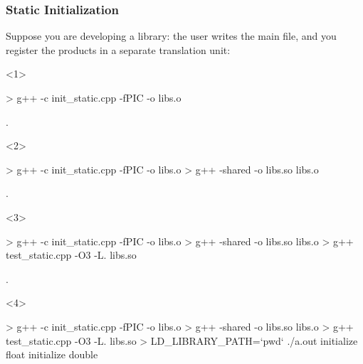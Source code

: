 \documentclass[aspectratio=43]{beamer}
\begin{document}
\begin{frame}[fragile]\frametitle{Static Initialization}
  Suppose you are developing a library: the user writes the main file, and you register the products in a separate translation unit:

  \begin{onlyenv}<1>
\begin{Shelllisting}{}
> g++ -c init_static.cpp -fPIC -o libs.o




.
\end{Shelllisting}
  \end{onlyenv}
  \begin{onlyenv}<2>
\begin{Shelllisting}{}
> g++ -c init_static.cpp -fPIC -o libs.o
> g++ -shared -o libs.so libs.o



.
\end{Shelllisting}
  \end{onlyenv}
  \begin{onlyenv}<3>
\begin{Shelllisting}{}
> g++ -c init_static.cpp -fPIC -o libs.o
> g++ -shared -o libs.so libs.o
> g++ test_static.cpp -O3 -L. libs.so


.
\end{Shelllisting}
  \end{onlyenv}
  \begin{onlyenv}<4>
\begin{Shelllisting}{}
> g++ -c init_static.cpp -fPIC -o libs.o
> g++ -shared -o libs.so libs.o
> g++ test_static.cpp -O3 -L. libs.so
> LD_LIBRARY_PATH=`pwd` ./a.out
initialize float
initialize double
\end{Shelllisting}
  \end{onlyenv}
\end{frame}
\end{document}

